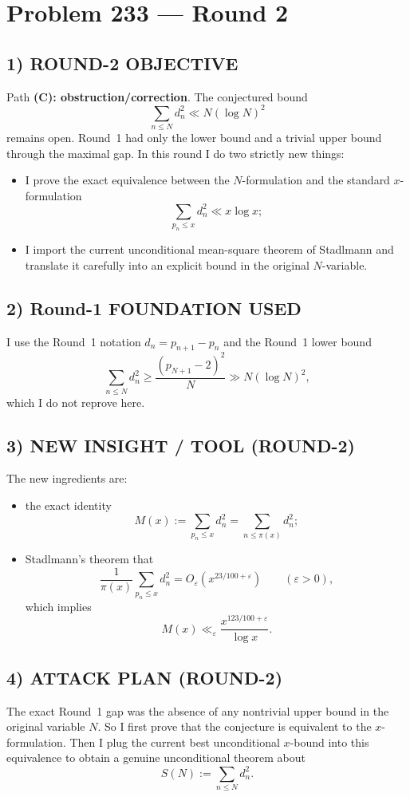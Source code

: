 \section*{Problem 233 --- Round 2}

\subsection*{1) ROUND-2 OBJECTIVE}
Path \textbf{(C): obstruction/correction}.  The conjectured bound
\[
\sum_{n\le N} d_n^2 \ll N(\log N)^2
\]
remains open.  Round~1 had only the lower bound and a trivial upper bound through the maximal gap.  In this round I do two strictly new things:
\begin{itemize}
\item I prove the exact equivalence between the $N$-formulation and the standard $x$-formulation
\[
\sum_{p_n\le x} d_n^2 \ll x\log x;
\]
\item I import the current unconditional mean-square theorem of Stadlmann and translate it carefully into an explicit bound in the original $N$-variable.
\end{itemize}

\subsection*{2) Round-1 FOUNDATION USED}
I use the Round~1 notation $d_n=p_{n+1}-p_n$ and the Round~1 lower bound
\[
\sum_{n\le N} d_n^2\ge \frac{(p_{N+1}-2)^2}{N}\gg N(\log N)^2,
\]
which I do not reprove here.

\subsection*{3) NEW INSIGHT / TOOL (ROUND-2)}
The new ingredients are:
\begin{itemize}
\item the exact identity
\[
M(x):=\sum_{p_n\le x} d_n^2 = \sum_{n\le \pi(x)} d_n^2;
\]
\item Stadlmann's theorem that
\[
\frac{1}{\pi(x)}\sum_{p_n\le x} d_n^2 = O_{\varepsilon}(x^{23/100+\varepsilon})
\qquad (\varepsilon>0),
\]
which implies
\[
M(x)\ll_{\varepsilon} \frac{x^{123/100+\varepsilon}}{\log x}.
\]
\end{itemize}

\subsection*{4) ATTACK PLAN (ROUND-2)}
The exact Round~1 gap was the absence of any nontrivial upper bound in the original variable $N$.  So I first prove that the conjecture is equivalent to the $x$-formulation.  Then I plug the current best unconditional $x$-bound into this equivalence to obtain a genuine unconditional theorem about
\[
S(N):=\sum_{n\le N} d_n^2.
\]

